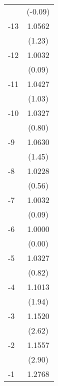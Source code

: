 {\begin{tabular}{l*{1}{c}}
                                   &     (-0.09)         \\
[1em]
  -13                              &      1.0562         \\
                                   &      (1.23)         \\
[1em]
  -12                              &      1.0032         \\
                                   &      (0.09)         \\
[1em]
  -11                              &      1.0427         \\
                                   &      (1.03)         \\
[1em]
  -10                              &      1.0327         \\
                                   &      (0.80)         \\
[1em]
   -9                              &      1.0630         \\
                                   &      (1.45)         \\
[1em]
   -8                              &      1.0228         \\
                                   &      (0.56)         \\
[1em]
   -7                              &      1.0032         \\
                                   &      (0.09)         \\
[1em]
   -6                              &      1.0000         \\
                                   &      (0.00)         \\
[1em]
   -5                              &      1.0327         \\
                                   &      (0.82)         \\
[1em]
   -4                              &      1.1013\sym{*}  \\
                                   &      (1.94)         \\
[1em]
   -3                              &      1.1520\sym{***}\\
                                   &      (2.62)         \\
[1em]
   -2                              &      1.1557\sym{***}\\
                                   &      (2.90)         \\
[1em]
   -1                              &      1.2768\sym{***}\\

\end{tabular}}
